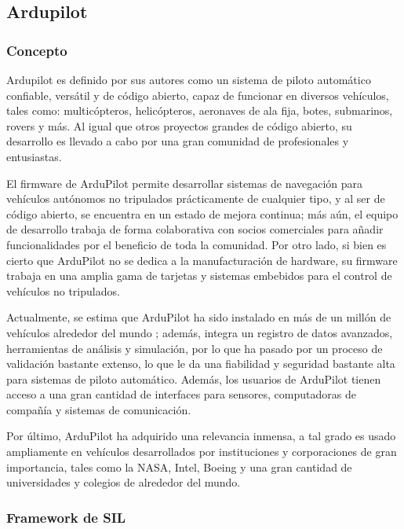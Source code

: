 \subsection{Ardupilot}

\subsubsection{Concepto}
Ardupilot es definido por sus autores \cite{ArduPilot} como un sistema de piloto automático confiable, versátil y de código abierto, capaz de funcionar en diversos vehículos, tales como: multicópteros, helicópteros, aeronaves de ala fija, botes, submarinos, rovers y más. Al igual que otros proyectos grandes de código abierto, su desarrollo es llevado a cabo por una gran comunidad de profesionales y entusiastas.  

El firmware de ArduPilot permite desarrollar sistemas de navegación para vehículos autónomos no tripulados prácticamente de cualquier tipo, y al ser de código abierto, se encuentra en un estado de mejora continua; más aún, el equipo de desarrollo trabaja de forma colaborativa con socios comerciales para añadir funcionalidades por el beneficio de toda la comunidad. Por otro lado, si bien es cierto que ArduPilot no se dedica a la manufacturación de hardware, su firmware trabaja en una amplia gama de tarjetas y sistemas embebidos para el control de vehículos no tripulados.  

Actualmente, se estima que ArduPilot ha sido instalado en más de un millón de vehículos alrededor del mundo \cite{ArduPilot}; además, integra un registro de datos avanzados, herramientas de análisis y simulación, por lo que ha pasado por un proceso de validación bastante extenso, lo que le da una fiabilidad y seguridad bastante alta para sistemas de piloto automático. Además, los usuarios de ArduPilot tienen acceso a una gran cantidad de interfaces para sensores, computadoras de compañía y sistemas de comunicación.

Por último, ArduPilot ha adquirido una relevancia inmensa, a tal grado es usado ampliamente en vehículos desarrollados por instituciones y corporaciones de gran importancia, tales como la NASA, Intel, Boeing y una gran cantidad de universidades y colegios de alrededor del mundo.

\subsubsection{Framework de SIL}

